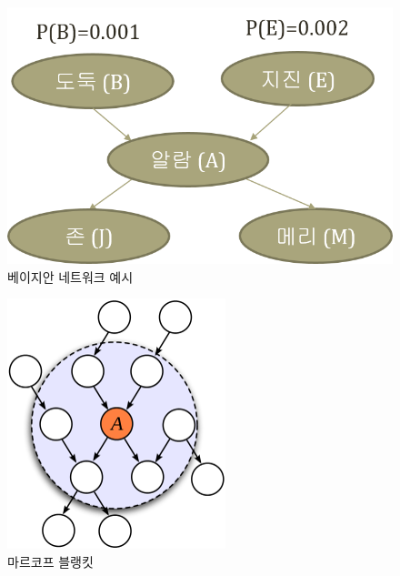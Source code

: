 \documentclass[a4paper]{oblivoir}
\begin{document}
\begin{figure}[ht] \centering 
\includegraphics[scale=0.6]{fig10_1.png} 
\caption{베이지안 네트워크 예시}
\label{fig:10-12-1}
\end{figure}  

\begin{figure}[ht] \centering 
\includegraphics[scale=0.6]{fig10_12.png} 
\caption{마르코프 블랭킷}
\label{fig:10-13}
\end{figure}  
\end{document}
